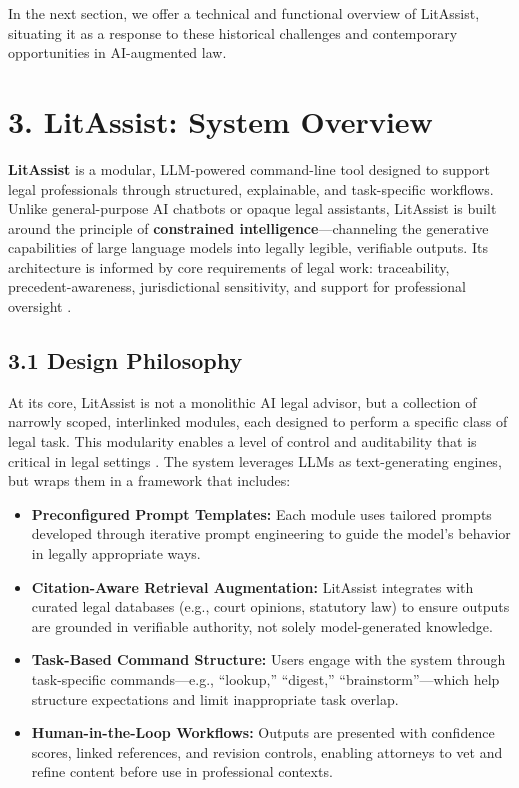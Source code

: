\documentclass[12pt,a4paper]{article}
\begin{document}
In the next section, we offer a technical and functional overview of LitAssist, situating it as a response to these historical challenges and contemporary opportunities in AI-augmented law.


\section*{3. LitAssist: System Overview}

\textbf{LitAssist} is a modular, LLM-powered command-line tool designed to support legal professionals through structured, explainable, and task-specific workflows. Unlike general-purpose AI chatbots or opaque legal assistants, LitAssist is built around the principle of \textbf{constrained intelligence}—channeling the generative capabilities of large language models into legally legible, verifiable outputs. Its architecture is informed by core requirements of legal work: traceability, precedent-awareness, jurisdictional sensitivity, and support for professional oversight \cite{Floridi2022}.

\subsection*{3.1 Design Philosophy}

At its core, LitAssist is not a monolithic AI legal advisor, but a collection of narrowly scoped, interlinked modules, each designed to perform a specific class of legal task. This modularity enables a level of control and auditability that is critical in legal settings \cite{Winfield2021}. The system leverages LLMs as text-generating engines, but wraps them in a framework that includes:

\begin{itemize}
\item \textbf{Preconfigured Prompt Templates:} Each module uses tailored prompts developed through iterative prompt engineering to guide the model's behavior in legally appropriate ways.

\item \textbf{Citation-Aware Retrieval Augmentation:} LitAssist integrates with curated legal databases (e.g., court opinions, statutory law) to ensure outputs are grounded in verifiable authority, not solely model-generated knowledge.

\item \textbf{Task-Based Command Structure:} Users engage with the system through task-specific commands—e.g., ``lookup,'' ``digest,'' ``brainstorm''—which help structure expectations and limit inappropriate task overlap.

\item \textbf{Human-in-the-Loop Workflows:} Outputs are presented with confidence scores, linked references, and revision controls, enabling attorneys to vet and refine content before use in professional contexts.
\end{itemize}
\end{document}
